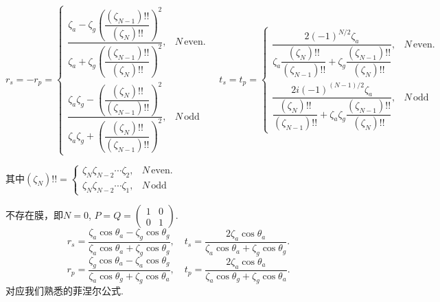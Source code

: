 \begin{example}
	\begin{equation*}
		r_s = -r_p =
		\begin{cases}
			\dfrac{\zeta_a - \zeta_g \left(\dfrac{(\zeta_{N-1})!!}{(\zeta_{N})!!}\right)^2}{\zeta_a + \zeta_g \left(\dfrac{(\zeta_{N-1})!!}{(\zeta_{N})!!}\right)^2}, & N\,\text{even}. \\[24pt]
			\dfrac{\zeta_a\zeta_g - \left(\dfrac{(\zeta_{N})!!}{(\zeta_{N-1})!!}\right)^2}{\zeta_a\zeta_g + \left(\dfrac{(\zeta_{N})!!}{(\zeta_{N-1})!!}\right)^2},   & N\,\text{odd}
		\end{cases}\quad
		t_s = t_p =
		\begin{cases}
			\dfrac{2(-1)^{N/2}\zeta_a}{\zeta_a \dfrac{(\zeta_{N})!!}{(\zeta_{N-1})!!} + \zeta_g \dfrac{(\zeta_{N-1})!!}{(\zeta_{N})!!}},         & N\,\text{even}. \\[24pt]
			\dfrac{2    i(-1)^{(N-1)/2}\zeta_a}{\dfrac{(\zeta_{N})!!}{(\zeta_{N-1})!!} + \zeta_a\zeta_g \dfrac{(\zeta_{N-1})!!}{(\zeta_{N})!!}}, & N\,\text{odd}
		\end{cases}
	\end{equation*}

	其中\((\zeta_{N})!! =
	\begin{cases}
		\zeta_{N}\zeta_{N-2}\cdots\zeta_2, & N\,\text{even}. \\
		\zeta_{N}\zeta_{N-2}\cdots\zeta_1, & N\,\text{odd}
	\end{cases}\)
\end{example}

\begin{example}
	不存在膜，即\(N = 0\), \(P = Q =
	\begin{pmatrix}
		1 & 0 \\
		0 & 1
	\end{pmatrix}\).
	\begin{equation*}
		r_s = \dfrac{\zeta_a \cos\theta_a - \zeta_g \cos\theta_g}{\zeta_a \cos\theta_a + \zeta_g \cos\theta_g},\quad t_s = \dfrac{2\zeta_a \cos\theta_a}{\zeta_a \cos\theta_a + \zeta_g \cos\theta_g}.
	\end{equation*}
	\begin{equation*}
		r_p = \dfrac{\zeta_g \cos\theta_a - \zeta_a \cos\theta_g}{\zeta_a \cos\theta_g + \zeta_g \cos\theta_a},\quad t_p = \dfrac{2\zeta_a \cos\theta_a}{\zeta_a \cos\theta_g + \zeta_g \cos\theta_a}.
	\end{equation*}
	对应我们熟悉的菲涅尔公式.
\end{example}

